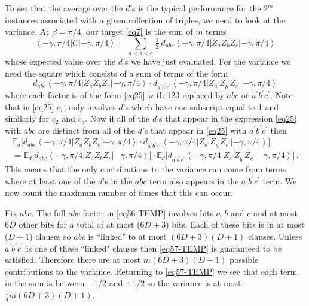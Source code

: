 \documentclass[t11pt,preprint,preprintnumbers]{revtex4}
\newcommand{\bra}[1]{\left\langle #1 \right|}
\newcommand{\ket}[1]{\left|#1\right\rangle}
\begin{document}
To see that the average over the $d$'s is the typical performance for the $2^m$ instances associated with a given collection of triples, we need to look at the variance. At $\beta=\pi/4$, our target \eqref{eq7} is the sum of $m$  terms
\begin{equation}\label{eq55-TEMP}%
\bra{-\gamma,  \pi/4} C \ket{-\gamma,  \pi/4} = \sum\limits_{a < b <c} \, \tfrac{1}{2} \ d_{abc} \bra{-\gamma,  \pi/4} Z_a Z_b Z_c \ket{-\gamma,  \pi/4} 
\end{equation}
whose expected value over the $d$'s we have just evaluated. For the variance we need the square which consists of a sum of terms of the form
\begin{equation}\label{eq56-TEMP}%
 d_{abc} \bra{-\gamma,  \pi/4} Z_a Z_b Z_c \ket{-\gamma,  \pi/4} \cdot d_{a^\prime b^\prime c^\prime} \bra{-\gamma,  \pi/4} Z_{a^\prime} Z_{b^\prime} Z_{c^\prime} \ket{-\gamma,  \pi/4}
\end{equation}
where each factor is of the form \eqref{eq25} with 123 replaced by $abc$ or $a^\prime b^\prime c^\prime$. Note that in \eqref{eq25} $c_1$, only involves $d$'s which have one subscript equal to 1 and similarly for $c_2$ and $c_3$. Now if all of the $d$'s that appear in the expression \eqref{eq25} with $abc$ are distinct from all of the $d$'s that appear in \eqref{eq25} with $a^\prime b^\prime c^\prime$ then
\begin{multline}\label{eq57-TEMP}%
\mathbb{E}_d \Big[d_{abc} \bra{-\gamma,  \pi/4} Z_a Z_b Z_c \ket{-\gamma,  \pi/4}\cdot  d_{a^\prime b^\prime c^\prime} \bra{-\gamma,  \pi/4} Z_{a^\prime} Z_{b^\prime} Z_{c^\prime} \ket{-\gamma,  \pi/4} \Big]\\
= \mathbb{E}_d \Big[d_{abc} \bra{-\gamma,  \pi/4} Z_a Z_b Z_c \ket{-\gamma,  \pi/4}\Big] \cdot \mathbb{E}_d \Big[d_{a^\prime b^\prime c^\prime} \bra{-\gamma,  \pi/4} Z_{a^\prime} Z_{b^\prime} Z_{c^\prime} \ket{-\gamma,  \pi/4} \Big]\, .
\end{multline}
This means that the only contributions to the variance can come from terms where at least one of the $d$'s in the $abc$ term also appears in the $a^\prime b^\prime c^\prime$ term. We now count the maximum number of times that this can occur.

Fix $abc$. The full $abc$ factor in \eqref{eq56-TEMP} involves bits $a, b$ and $c$  and at most $6 D$ other bits for a total of at most ($6D + 3$) bits. Each of these bits is in at most ($D+1$) clauses so $abc$ is ``linked" to at most $(6D+3)(D+1)$ clauses. Unless $a^\prime b^\prime c^\prime$ is one of these ``linked" clauses then \eqref{eq57-TEMP} is guaranteed to be satisfied. Therefore there are at most $m(6 D+3) (D+1)$ possible contributions to the variance. Returning to \eqref{eq57-TEMP} we see that each term in the sum is between $-1/2$ and $+1/2$ so the variance is at most $\frac{1}{4} m (6D+3) (D+1)$.
\end{document}
